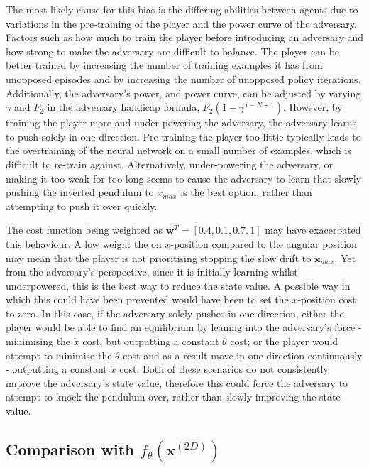 \documentclass[../main.tex]{subfiles}
\begin{document}
The most likely cause for this bias is the differing abilities between agents due to variations in the pre-training of the player and the power curve of the adversary. Factors such as how much to train the player before introducing an adversary and how strong to make the adversary are difficult to balance. The player can be better trained by increasing the number of training examples it has from unopposed episodes and by increasing the number of unopposed policy iterations. Additionally, the adversary's power, and power curve, can be adjusted by varying $\gamma$ and $F_2$ in the adversary handicap formula, $F_2(1-\gamma^{\, i-N+1})$. However, by training the player more and under-powering the adversary, the adversary learns to push solely in one direction. Pre-training the player too little typically leads to the overtraining of the neural network on a small number of examples, which is difficult to re-train against. Alternatively, under-powering the adversary, or making it too weak for too long seems to cause the adversary to learn that slowly pushing the inverted pendulum to $x_{max}$ is the best option, rather than attempting to push it over quickly.

The cost function being weighted as $\boldsymbol{w}^T = [0.4, 0.1, 0.7, 1]$ may have exacerbated this behaviour. A low weight the on $x$-position compared to the angular position may mean that the player is not prioritising stopping the slow drift to $\boldsymbol{x}_{max}$. Yet from the adversary's perspective, since it is initially learning whilst underpowered, this is the best way to reduce the state value. A possible way in which this could have been prevented would have been to set the $x$-position cost to zero. In this case, if the adversary solely pushes in one direction, either the player would be able to find an equilibrium by leaning into the adversary's force - minimising the $\dot{x}$ cost, but outputting a constant $\theta$ cost; or the player would attempt to minimise the $\theta$ cost and as a result move in one direction continuously - outputting a constant $\dot{x}$ cost. Both of these scenarios do not consistently improve the adversary's state value, therefore this could force the adversary to attempt to knock the pendulum over, rather than slowly improving the state-value.


\subsection{Comparison with $f_{\theta}(\boldsymbol{x}^{(2D)})$}
\end{document}
